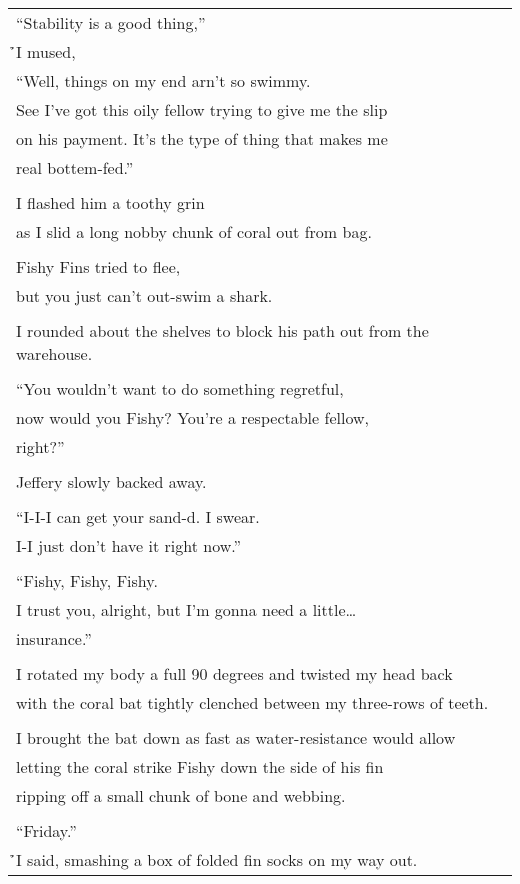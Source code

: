 \documentclass{article}
\begin{document}
\begin{center}
\begin{tabular}{l}
``Stability is a good thing,'' \\
\h\h{}I mused, \\
``Well, things on my end arn't so swimmy. \\
See I've got this oily fellow trying to give me the slip \\
on his payment.  It's the type of thing that makes me \\
real bottem-fed.'' \\
\\
I flashed him a toothy grin \\
as I slid a long nobby chunk of coral out from bag. \\
\\
Fishy Fins tried to flee, \\
but you just can't out-swim a shark. \\
\\
I rounded about the shelves to block his path out from the warehouse. \\
\\
``You wouldn't want to do something regretful, \\
now would you Fishy? You're a respectable fellow, \\
right?'' \\
\\
Jeffery slowly backed away. \\
\\
``I-I-I can get your sand-d. I swear. \\
I-I just don't have it right now.'' \\
\\
``Fishy, Fishy, Fishy. \\
I trust you, alright, but I'm gonna need a little\ldots{} \\
insurance.'' \\
\\
I rotated my body a full 90 degrees and twisted my head back \\
with the coral bat tightly clenched between my three-rows of teeth. \\
\\
I brought the bat down as fast as water-resistance would allow \\
letting the coral strike Fishy down the side of his fin \\
ripping off a small chunk of bone and webbing. \\
\\
``Friday.'' \\
\h\h{}I said, smashing a box of folded fin socks on my way out. \\

\end{tabular}
\end{center}
\end{document}

